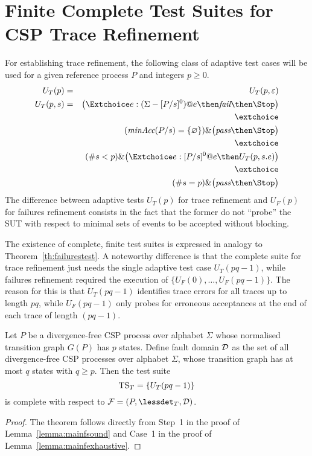 \section{Finite Complete Test Suites for CSP Trace Refinement}
\label{sec:finitecomplete}

For establishing trace refinement, the following class of adaptive test cases
will be used for a given reference process $P$ and  integers $p \ge 0$.
%
\begin{eqnarray}
U_T(p) & = & U_T(p,\varepsilon)
\\
U_T(p,s) & = & \big(\Extchoice e:(\Sigma - [P/s]^0) @ e \then \efail\then \Stop \big)
\label{eq:uta}
\\ & & \extchoice \nonumber
\\ & & (\minaccs(P/s) = \{ \varnothing \})   \&   \big( \epass \then \Stop \big)
\label{eq:utb}
\\ & & \extchoice \nonumber
\\ & & (\#s < p) \& \big(\Extchoice e:[P/s]^0 @ e \then U_T(p,s.e) \big)
\label{eq:utc}
\\ & & \extchoice \nonumber
\\ & & (\#s = p) \& \big( \epass\then \Stop  \big)
\label{eq:utd}
\end{eqnarray}
%
The difference between adaptive tests $U_T(p)$ for trace refinement and
$U_F(p)$ for failures refinement consists in the fact that the former do not
``probe'' the SUT with respect to minimal sets of events to be accepted
without blocking.

The existence of complete, finite test suites is expressed in analogy to
Theorem~\ref{th:failurestest}. A noteworthy difference is that the complete
suite for trace refinement just needs the single adaptive test case
$U_T(pq-1)$, while failures refinement required the execution of $\{
U_F(0),\dots,U_F(pq-1)\}$. The reason for this is that $U_T(pq-1)$ identifies
trace errors for all traces up to length $pq$, while $U_F(pq-1)$ only probes
for erroneous acceptances at the end of each trace of length $(pq -1)$.

\begin{theorem}\label{th:tracetest}
Let $P$ be a divergence-free CSP process over alphabet $\Sigma$ whose
normalised transition graph $G(P)$ has $p$ states. Define fault domain ${\cal
D}$ as the set of all divergence-free CSP processes over alphabet $\Sigma$,
whose transition graph has at most $q$ states with $q \ge p$. Then the test
suite
\[
{\text{TS}}_T = \{ U_T(pq-1)   \}
\]
is complete with respect to ${\cal F} = (P,\lessdet_T,{\cal D})$.
\xbox
\end{theorem}
\begin{proof}
The theorem follows directly  
from Step~1 in the proof of Lemma~\ref{lemma:mainfsound} and
Case~1 in the proof of Lemma~\ref{lemma:mainfexhaustive}.
\xbox
\end{proof}
 